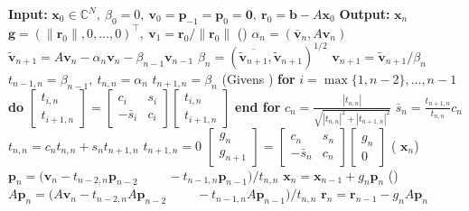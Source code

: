 \begin{algorithm}[H]\caption{}\label{alg:qmr-sym}\begin{algorithmic}[1]
\Statex\textbf{Input:} $\bm x_0\in\mathbb C^N,\ \beta_0=0,\ \bm v_0=\bm p_{-1}=\bm p_0=\bm0,\ \bm r_0=\bm b-A\bm x_0$
\Statex\textbf{Output:} $\bm x_n$
\State $\bm g=(\|\bm r_0\|,0,\ldots,0)^{\top},\ \bm v_1=\bm r_0/\|\bm r_0\|$
\State ()
\State $\alpha_n=(\bar{\bm v}_n,A\bm v_n)$
\State $\widetilde{\bm v}_{n+1}=A\bm v_n-\alpha_n\bm v_n-\beta_{n-1}\bm v_{n-1}$
\State $\beta_n=(\overline{\widetilde{\bm v}_{n+1}},\widetilde{\bm v}_{n+1})^{1/2}$
\State $\bm v_{n+1}=\widetilde{\bm v}_{n+1}/\beta_n$
\State $t_{n-1,n}=\beta_{n-1},\ t_{n,n}=\alpha_n$
\State $t_{n+1,n}=\beta_n$
\State (Givens )
\State \textbf{for} $i=\max\{1,n-2\},\ldots,n-1$ \textbf{do}
\State $\begin{bmatrix}t_{i,n}\\t_{i+1,n}\end{bmatrix}=\begin{bmatrix}c_i&s_i\\-\bar s_i&c_i\end{bmatrix}\begin{bmatrix}t_{i,n}\\t_{i+1,n}\end{bmatrix}$
\State \textbf{end for}
\State $c_n=\frac{|t_{n,n}|}{\sqrt{|t_{n,n}|^2+|t_{n+1,n}|^2}}$
\State $\bar s_n=\frac{t_{n+1,n}}{t_{n,n}}c_n$
\State $t_{n,n}=c_nt_{n,n}+s_nt_{n+1,n}$
\State $t_{n+1,n}=0$
\State $\begin{bmatrix}g_n\\g_{n+1}\end{bmatrix}=\begin{bmatrix}c_n&s_n\\-\bar s_n&c_n\end{bmatrix}\begin{bmatrix}g_n\\0\end{bmatrix}$
\State ( $\bm x_n$)
\State $\bm p_n=(\bm v_n-t_{n-2,n}\bm p_{n-2}$
\State $\qquad-t_{n-1,n}\bm p_{n-1})/t_{n,n}$
\State $\bm x_n=\bm x_{n-1}+g_n\bm p_n$
\State ()
\State $A\bm p_n=(A\bm v_n-t_{n-2,n}A\bm p_{n-2}$
\State $\qquad-t_{n-1,n}A\bm p_{n-1})/t_{n,n}$
\State $\bm r_n=\bm r_{n-1}-g_nA\bm p_n$
\State {}
\EndFor\end{algorithmic}\end{algorithm}
